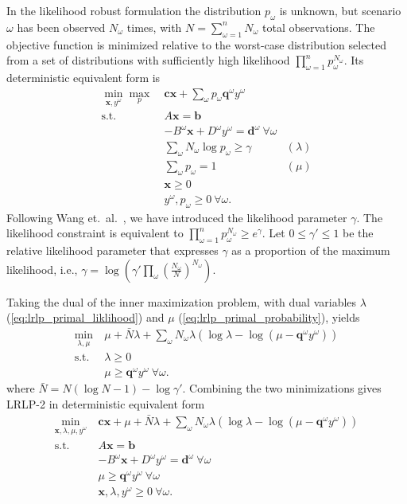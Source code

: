 \documentclass[11pt]{article}
\newcommand{\x}{\mathbf{x}}
\renewcommand{\c}{\mathbf{c}}
\newcommand{\q}{\mathbf{q}}
\renewcommand{\b}{\mathbf{b}}
\renewcommand{\d}{\mathbf{d}}
\newcommand{\st}{\mbox{s.t.}}
\begin{document}
In the likelihood robust formulation the distribution $p_\omega$ is unknown, but scenario $\omega$ has been observed $N_\omega$ times, with $N = \sum_{\omega=1}^n N_\omega$ total observations.  The objective function is minimized relative to the worst-case distribution selected from a set of distributions with sufficiently high likelihood $\prod_{\omega=1}^n p_\omega^{N_\omega}$.  Its deterministic equivalent form is
\begin{align}
	\min_{\x,y^\omega} \max_p \ & \c\x + \sum_\omega p_\omega \q^\omega y^\omega \label{eq:lrlp_primal}\\
	\st \ & A\x = \b \nonumber \\
	& -B^\omega \x + D^\omega y^\omega = \d^\omega\ \forall \omega \nonumber \\
	& \sum_\omega N_\omega \log p_\omega \geq \gamma & (\lambda) \label{eq:lrlp_primal_liklihood} \\
	& \sum_\omega p_\omega = 1 & (\mu) \label{eq:lrlp_primal_probability} \\
	& \x \geq 0 \nonumber \\
	& y^\omega, p_\omega \geq 0\ \forall \omega. \nonumber
\end{align}
Following Wang et.\ al.\ \cite{wang2010likelihood}, we have introduced the likelihood parameter $\gamma$.  The likelihood constraint is equivalent to $\prod_{\omega=1}^n p_\omega^{N_\omega} \geq e^\gamma$.  Let $0 \leq \gamma' \leq 1$ be the relative likelihood parameter that expresses $\gamma$ as a proportion of the maximum likelihood, i.e., $\gamma = \log( \gamma' \prod_\omega (\tfrac{N_\omega}{N})^{N_\omega})$.

Taking the dual of the inner maximization problem, with dual variables $\lambda$ (\ref{eq:lrlp_primal_liklihood}) and $\mu$ (\ref{eq:lrlp_primal_probability}), yields
\begin{align*}
	\min_{\lambda,\mu} \ & \mu + \bar{N}\lambda + \sum_\omega N_\omega\lambda(\log\lambda - \log(\mu-\q^\omega y^\omega)) \\
	\st \ & \lambda \geq 0 \\
	& \mu \geq \q^\omega y^\omega \ \forall \omega.
\end{align*}
where $\bar{N} = N(\log N - 1) - \log\gamma'$.  Combining the two minimizations gives LRLP-2 in deterministic equivalent form
\begin{align}
	\min_{\x,\lambda,\mu,y^\omega} \ & \c\x + \mu + \bar{N}\lambda + \sum_\omega N_\omega\lambda(\log\lambda - \log(\mu-\q^\omega y^\omega)) \nonumber \\
	\st \ & A\x = \b \nonumber \\
	& -B^\omega \x + D^\omega y^\omega = \d^\omega\ \forall \omega \label{eq:lrlp_det_equiv} \\
	& \mu \geq \q^\omega y^\omega \ \forall \omega \nonumber \\
	& \x,\lambda,y^\omega \geq 0 \ \forall \omega. \nonumber
\end{align}
\end{document}
